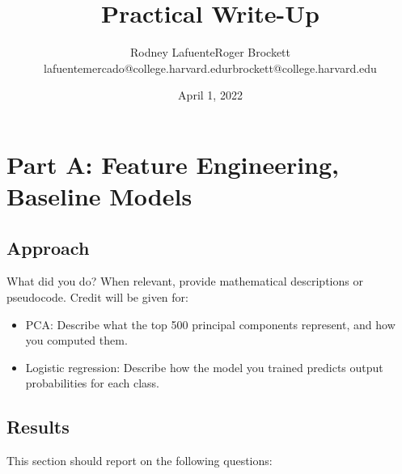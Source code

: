 \documentclass[11pt]{article}
\title{Practical Write-Up}
\author{Rodney Lafuente\hspace{4cm}Roger Brockett \\ 
lafuentemercado@college.harvard.edu\hspace{1cm}rbrockett@college.harvard.edu}
\date{April 1, 2022}
\begin{document}
\maketitle{}

\section{Part A: Feature Engineering, Baseline Models}

\subsection{Approach}

What did you do? When relevant, provide mathematical descriptions or pseudocode. Credit will be given for:

  \begin{itemize}
  \item PCA:  Describe what the top 500 principal components represent, and how you computed them.
  \item Logistic regression: Describe how the model you trained predicts output probabilities for each class.
  \end{itemize}

\subsection{Results}

This section should report on the following questions: 
\end{document}
